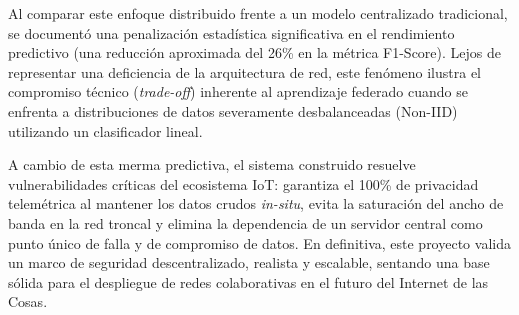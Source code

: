 \documentclass[12pt,a4paper]{article}
\begin{document}
Al comparar este enfoque distribuido frente a un modelo centralizado tradicional, se documentó una penalización estadística significativa en el rendimiento predictivo (una reducción aproximada del 26\% en la métrica F1-Score). Lejos de representar una deficiencia de la arquitectura de red, este fenómeno ilustra el compromiso técnico (\textit{trade-off}) inherente al aprendizaje federado cuando se enfrenta a distribuciones de datos severamente desbalanceadas (Non-IID) utilizando un clasificador lineal. 

A cambio de esta merma predictiva, el sistema construido resuelve vulnerabilidades críticas del ecosistema IoT: garantiza el 100\% de privacidad telemétrica al mantener los datos crudos \textit{in-situ}, evita la saturación del ancho de banda en la red troncal y elimina la dependencia de un servidor central como punto único de falla y de compromiso de datos. En definitiva, este proyecto valida un marco de seguridad descentralizado, realista y escalable, sentando una base sólida para el despliegue de redes colaborativas en el futuro del Internet de las Cosas.
\end{document}
